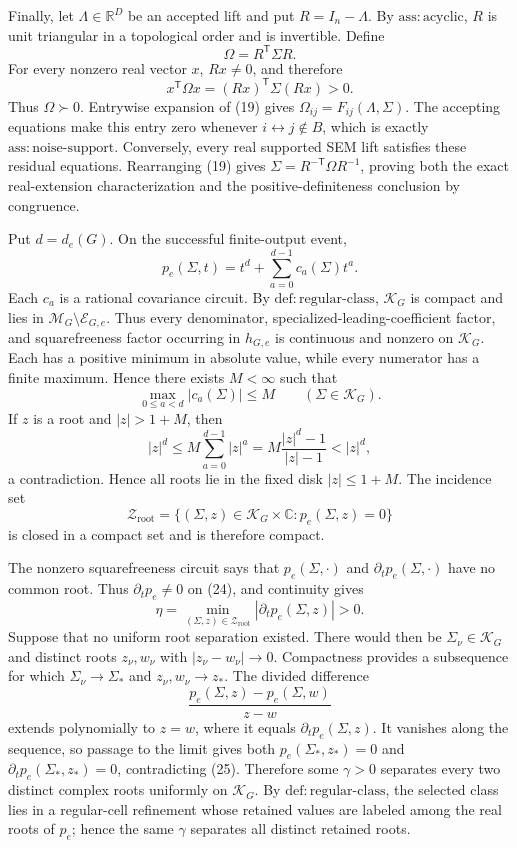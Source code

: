 Finally, let \(\Lambda\in\mathbb R^D\) be an accepted lift and put \(R=I_n-\Lambda\).  By \(\mathrm{ass:acyclic}\), \(R\) is unit triangular in a topological order and is invertible.  Define
\[
 \Omega=R^{\mathsf T}\Sigma R.
\tag{19}
\]
For every nonzero real vector \(x\), \(Rx\ne0\), and therefore
\[
 x^{\mathsf T}\Omega x=(Rx)^{\mathsf T}\Sigma(Rx)>0.
\tag{20}
\]
Thus \(\Omega\succ0\).  Entrywise expansion of (19) gives \(\Omega_{ij}=F_{ij}(\Lambda,\Sigma)\).  The accepting equations make this entry zero whenever \(i\leftrightarrow j\notin B\), which is exactly \(\mathrm{ass:noise\mbox{-}support}\).  Conversely, every real supported SEM lift satisfies these residual equations.  Rearranging (19) gives \(\Sigma=R^{-\mathsf T}\Omega R^{-1}\), proving both the exact real-extension characterization and the positive-definiteness conclusion by congruence.

Put \(d=d_e(G)\).  On the successful finite-output event,
\[
 p_e(\Sigma,t)=t^d+\sum_{a=0}^{d-1}c_a(\Sigma)t^a.
\tag{21}
\]
Each \(c_a\) is a rational covariance circuit.  By \(\mathrm{def:regular\mbox{-}class}\), \(\mathcal K_G\) is compact and lies in \(\mathcal M_G\setminus\mathcal E_{G,e}\).  Thus every denominator, specialized-leading-coefficient factor, and squarefreeness factor occurring in \(h_{G,e}\) is continuous and nonzero on \(\mathcal K_G\).  Each has a positive minimum in absolute value, while every numerator has a finite maximum.  Hence there exists \(M<\infty\) such that
\[
 \max_{0\leq a<d}|c_a(\Sigma)|\leq M
 \qquad(\Sigma\in\mathcal K_G).
\tag{22}
\]
If \(z\) is a root and \(|z|>1+M\), then
\[
 |z|^d
 \leq M\sum_{a=0}^{d-1}|z|^a
 =M\frac{|z|^d-1}{|z|-1}
 <|z|^d,
\tag{23}
\]
a contradiction.  Hence all roots lie in the fixed disk \(|z|\leq1+M\).  The incidence set
\[
 \mathcal Z_{\mathrm{root}}
 =\{(\Sigma,z)\in\mathcal K_G\times\mathbb C:p_e(\Sigma,z)=0\}
\tag{24}
\]
is closed in a compact set and is therefore compact.

The nonzero squarefreeness circuit says that \(p_e(\Sigma,\cdot)\) and \(\partial_t p_e(\Sigma,\cdot)\) have no common root.  Thus \(\partial_t p_e\ne0\) on (24), and continuity gives
\[
 \eta=\min_{(\Sigma,z)\in\mathcal Z_{\mathrm{root}}}
 |\partial_t p_e(\Sigma,z)|>0.
\tag{25}
\]
Suppose that no uniform root separation existed.  There would then be \(\Sigma_\nu\in\mathcal K_G\) and distinct roots \(z_\nu,w_\nu\) with \(|z_\nu-w_\nu|\to0\).  Compactness provides a subsequence for which \(\Sigma_\nu\to\Sigma_*\) and \(z_\nu,w_\nu\to z_*\).  The divided difference
\[
 \frac{p_e(\Sigma,z)-p_e(\Sigma,w)}{z-w}
\tag{26}
\]
extends polynomially to \(z=w\), where it equals \(\partial_t p_e(\Sigma,z)\).  It vanishes along the sequence, so passage to the limit gives both \(p_e(\Sigma_*,z_*)=0\) and \(\partial_t p_e(\Sigma_*,z_*)=0\), contradicting (25).  Therefore some \(\gamma>0\) separates every two distinct complex roots uniformly on \(\mathcal K_G\).  By \(\mathrm{def:regular\mbox{-}class}\), the selected class lies in a regular-cell refinement whose retained values are labeled among the real roots of \(p_e\); hence the same \(\gamma\) separates all distinct retained roots.

